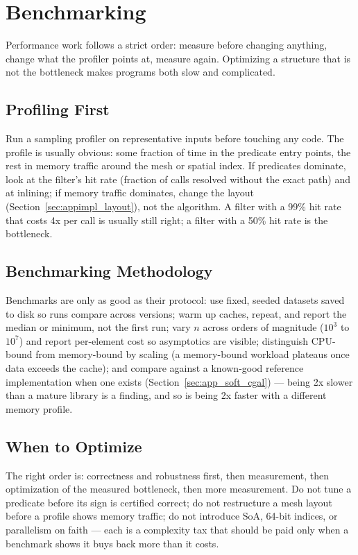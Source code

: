 \section{Benchmarking}
\label{sec:app_impl_benchmarking}
Performance work follows a strict order: measure before changing anything,
change what the profiler points at, measure again. Optimizing a structure
that is not the bottleneck makes programs both slow and complicated.
\subsection{Profiling First}
\label{sec:appimpl_profiling}
Run a sampling profiler on representative inputs before
touching any code. The profile is usually obvious: some fraction of time in
the predicate entry points, the rest in memory traffic around the mesh or
spatial index. If predicates dominate, look at the filter's
hit rate (fraction of calls resolved
without the exact path) and at inlining; if memory traffic dominates,
change the layout (Section~\ref{sec:appimpl_layout}), not the algorithm. A
filter with a 99\% hit rate that costs 4x per call is usually still right;
a filter with a 50\% hit rate is the bottleneck.
\subsection{Benchmarking Methodology}
\label{sec:appimpl_method}
Benchmarks are only as good as their protocol: use fixed, seeded datasets
saved to disk so runs compare across versions; warm up caches, repeat, and
report the median or minimum, not the first run; vary $n$ across orders of
magnitude ($10^3$ to $10^7$) and report per-element cost so asymptotics are
visible; distinguish CPU-bound from memory-bound by scaling (a memory-bound
workload plateaus once data exceeds the cache); and compare against a
known-good reference implementation when one exists
(Section~\ref{sec:app_soft_cgal}) --- being 2x slower than a mature library
is a finding, and so is being 2x faster with a different memory profile.
\subsection{When to Optimize}
\label{sec:appimpl_when}
The right order is: correctness and robustness first, then measurement, then
optimization of the measured bottleneck, then more measurement. Do not tune
a predicate before its sign is certified correct; do not restructure a mesh
layout before a profile shows memory traffic; do not introduce SoA, 64-bit
indices, or parallelism on faith --- each is a complexity tax that should be
paid only when a benchmark shows it buys back more than it costs.
